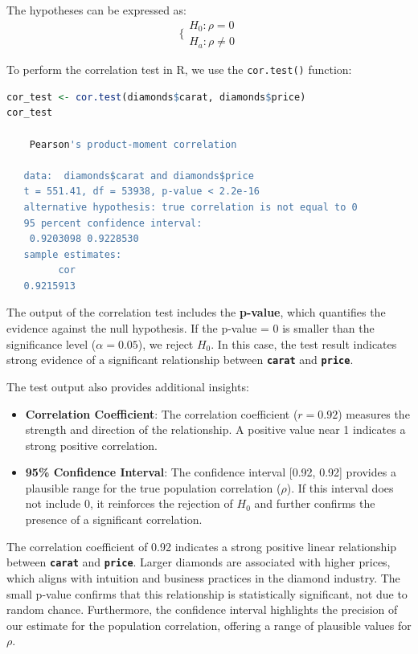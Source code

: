 \documentclass[
]{book}
\newcommand{\passthrough}[1]{#1}
\providecommand{\tightlist}{%
  \setlength{\itemsep}{0pt}\setlength{\parskip}{0pt}}
\theoremstyle{definition}
\theoremstyle{definition}
\theoremstyle{definition}
\theoremstyle{definition}
\theoremstyle{remark}
\begin{document}
The hypotheses can be expressed as:
\[
\bigg\{
\begin{matrix}
    H_0: \rho   =  0 \\
    H_a: \rho \neq 0 
\end{matrix}
\]

To perform the correlation test in R, we use the \passthrough{\lstinline!cor.test()!} function:

\begin{lstlisting}[language=R]
cor_test <- cor.test(diamonds$carat, diamonds$price)
cor_test
   
    Pearson's product-moment correlation
   
   data:  diamonds$carat and diamonds$price
   t = 551.41, df = 53938, p-value < 2.2e-16
   alternative hypothesis: true correlation is not equal to 0
   95 percent confidence interval:
    0.9203098 0.9228530
   sample estimates:
         cor 
   0.9215913
\end{lstlisting}

The output of the correlation test includes the \textbf{p-value}, which quantifies the evidence against the null hypothesis. If the p-value = 0 is smaller than the significance level (\(\alpha = 0.05\)), we reject \(H_0\). In this case, the test result indicates strong evidence of a significant relationship between \textbf{\passthrough{\lstinline!carat!}} and \textbf{\passthrough{\lstinline!price!}}.

The test output also provides additional insights:

\begin{itemize}
\tightlist
\item
  \textbf{Correlation Coefficient}: The correlation coefficient (\(r = 0.92\)) measures the strength and direction of the relationship. A positive value near 1 indicates a strong positive correlation.
\item
  \textbf{95\% Confidence Interval}: The confidence interval {[}0.92, 0.92{]} provides a plausible range for the true population correlation (\(\rho\)). If this interval does not include 0, it reinforces the rejection of \(H_0\) and further confirms the presence of a significant correlation.
\end{itemize}

The correlation coefficient of 0.92 indicates a strong positive linear relationship between \textbf{\passthrough{\lstinline!carat!}} and \textbf{\passthrough{\lstinline!price!}}. Larger diamonds are associated with higher prices, which aligns with intuition and business practices in the diamond industry. The small p-value confirms that this relationship is statistically significant, not due to random chance. Furthermore, the confidence interval highlights the precision of our estimate for the population correlation, offering a range of plausible values for \(\rho\).
\end{document}
